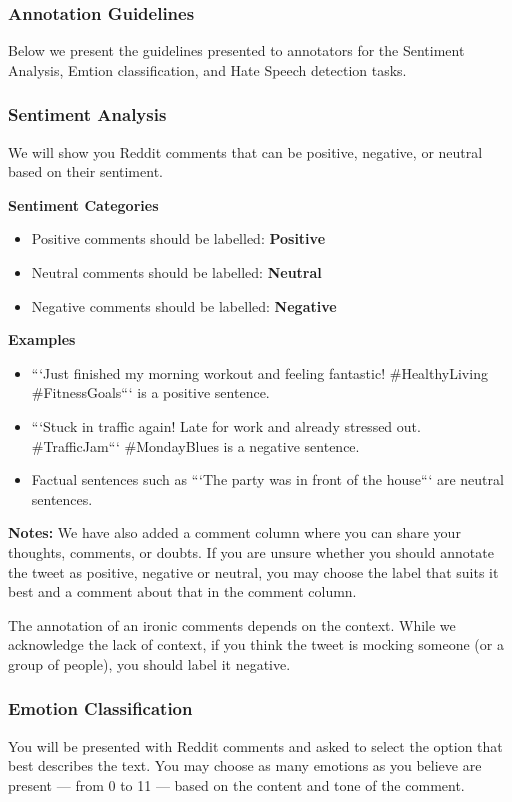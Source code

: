 \subsubsection{Annotation Guidelines}
\label{sec:appendix_guidelines}
Below we present the guidelines presented to annotators for the Sentiment Analysis, Emtion classification, and Hate Speech detection tasks.

\subsubsection*{Sentiment Analysis}
We will show you Reddit comments that can be positive, negative, or neutral based on their sentiment. 

\noindent \textbf{Sentiment Categories}
\begin{itemize}
    \item Positive comments should be labelled: \textbf{Positive}
    \item Neutral comments should be labelled:  \textbf{Neutral}
    \item Negative comments should be labelled: \textbf{Negative}
\end{itemize}

\noindent \textbf{Examples}
\begin{itemize}
    \item ```Just finished my morning workout and feeling fantastic!  \#HealthyLiving \#FitnessGoals``` is a positive sentence.
    \item ```Stuck in traffic again!  Late for work and already stressed out. \#TrafficJam``` \#MondayBlues is a negative  sentence.
    \item Factual sentences such as ```The party was in front of the house``` are neutral  sentences.
\end{itemize}

\noindent \textbf{Notes:}
\noindent We have also added a comment column where you can share your thoughts, comments, or doubts. If you are unsure whether you should annotate the tweet as positive, negative or neutral, you may choose the label that suits it best and a comment about that in the comment column. 

\noindent  The annotation of an ironic comments depends on the context. While we acknowledge the lack of context, if you think the tweet is mocking someone (or a group of people), you should label it negative.


\subsubsection*{Emotion Classification}
You will be presented with Reddit comments and asked to select the option that best describes the text.
You may choose as many emotions as you believe are present — from 0 to 11 — based on the content and tone of the comment.


